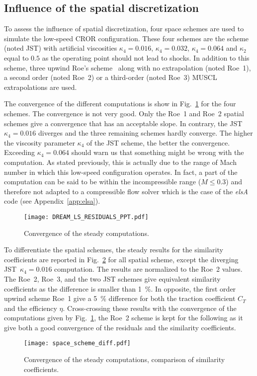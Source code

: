 \subsection{Influence of the spatial discretization} %
\label{sub:dream_ls_spatial_discretization}

To assess the influence of spatial discretization, four 
space schemes are used to simulate the low-speed CROR configuration.
These four schemes are the \citet{Jameson1981} scheme (noted JST) with artificial
viscosities $\kappa_4 = 0.016$, $\kappa_4 = 0.032$, $\kappa_4 = 0.064$
and $\kappa_2$ equal to $0.5$ as the operating point should not 
lead to shocks. In addition to this scheme, three upwind
Roe's scheme~\cite{Roe1981} along with no extrapolation (noted Roe~1),
a second order (noted Roe~2) or a third-order (noted Roe~3) 
MUSCL extrapolations are used.

The convergence of the different computations is show 
in Fig.~\ref{fig:dream_ls_space_scheme_residual}
for the four schemes. The convergence is not 
very good. Only the Roe~1 and Roe~2 spatial schemes give 
a convergence that has an acceptable slope. In contrary,
the JST~$\kappa_4 = 0.016$ diverges and the three
remaining schemes hardly converge. The higher the
viscosity parameter $\kappa_4$ of the JST scheme, the better
the convergence. Exceeding $\kappa_4 = 0.064$ should
warn us that something might be wrong with the computation.
As stated previously, this is actually due to the range of Mach
number in which this low-speed configuration operates. In fact,
a part of the computation can be said to be within the incompressible
range ($M \leq 0.3$) and therefore not adapted to a compressible
flow solver which is the case of the \emph{elsA} code 
(see Appendix~\ref{app:elsa}).
\begin{figure}[htb]
  \centering
  \texttt{[image: DREAM\_LS\_RESIDUALS\_PPT.pdf]}
  \caption{Convergence of the steady computations.}
  \label{fig:dream_ls_space_scheme_residual}
\end{figure}

To differentiate the spatial schemes, 
the steady results for the similarity coefficients are reported
in Fig.~\ref{fig:dream_ls_space_scheme_coeff} for all spatial scheme, 
except the diverging JST~$\kappa_4 = 0.016$ computation.
The results are normalized to the Roe~2 values.
The Roe~2, Roe~3, and the two JST schemes give equivalent
similarity coefficients as the difference is smaller than 1~\%.
In opposite, the first order upwind scheme Roe~1 give a 5~\%
difference for both the traction coefficient $C_T$ and the efficiency $\eta$.
Cross-crossing these results with the convergence of the computations
given by Fig.~\ref{fig:dream_ls_space_scheme_residual}, the Roe~2
scheme is kept for the following as it give both a good convergence
of the residuals and the similarity coefficients.
\begin{figure}[htb]
  \centering
  \texttt{[image: space\_scheme\_diff.pdf]}
  \caption{Convergence of the steady computations, comparison of similarity coefficients.}
  \label{fig:dream_ls_space_scheme_coeff}
\end{figure}
